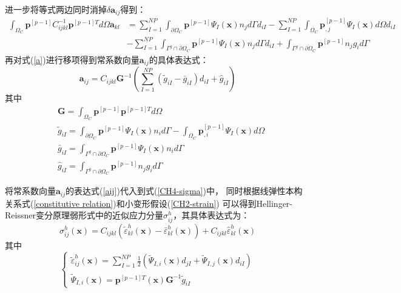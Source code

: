 进一步将等式两边同时消掉$\delta\pmb{a}_{ij}$得到：
\begin{equation}\label{a}
\begin{split}
        \int_{\Omega_C}\pmb{p}^{[p-1]}C^{-1}_{ijkl}\pmb{p}^{[p-1]T}d\Omega\pmb{a}_{kl}&=\sum_{I=1}^{N\!P}\int_{\partial\Omega_C}\pmb{p}^{[p-1]}\Psi_I(\pmb{x})n_jd\Gamma d_{iI}-\sum_{I=1}^{N\!P}\int_{\Omega_C}\pmb{p}_{,j}^{[p-1]}\Psi_{I}(\pmb{x})d\Omega d_{iI}\\
         &-\sum_{I=1}^{N\!P}\int_{\Gamma^g\cap\partial\Omega_C}\pmb{p}^{[p-1]}\Psi_I(\pmb{x})n_jd\Gamma d_{iI}+\int_{\Gamma^g\cap\partial\Omega_C}\pmb{p}^{[p-1]}n_jg_id\Gamma
\end{split}
\end{equation}
再对式(\ref{a})进行移项得到常系数向量$\pmb{a}_{ij}$的具体表达式：
\begin{equation}\label{aij}
 \pmb{a}_{ij}=C_{ijkl}\pmb{G}^{-1}(\sum_{I=1}^{N\!P}(\tilde{g}_{iI}-\bar{g}_{iI})d_{iI}+\hat{g}_{iI})
\end{equation}
其中
\begin{align}
    \label{g1}&\pmb{G}=\int_{\Omega_C}\pmb{p}^{[p-1]}\pmb{p}^{[p-1]T}d\Omega\\
    \label{g2} &\tilde{g}_{iI}=\int_{\partial\Omega_C}\pmb{p}^{[p-1]}\Psi_I(\pmb{x})n_id\Gamma-\int_{\Omega_C}\pmb{p}_{,i}^{[p-1]}\Psi_{I}(\pmb{x})d\Omega\\
    \label{g3} &\bar{g}_{iI}=\int_{\Gamma^g\cap\partial\Omega_C}\pmb{p}^{[p-1]}\Psi_I(\pmb{x})n_id\Gamma\\
   \label{g4} &\hat{g}_{iI}=\int_{\Gamma^g\cap\partial\Omega_C}\pmb{p}^{[p-1]}n_jg_id\Gamma
\end{align}\par
将常系数向量$\pmb{a}_{ij}$的表达式(\ref{aij})代入到式(\ref{CH4-sigma})中，
同时根据线弹性本构关系式(\ref{constitutive relation})和小变形假设(\ref{CH2-strain})
可以得到Hellinger-Reissner变分原理弱形式中的近似应力分量$\sigma^h_{ij}$，其具体表达式为：
\begin{equation}\label{sigmah}
    \sigma^h_{ij}(\pmb{x})=C_{ijkl}(\tilde{\varepsilon}^h_{kl}(\pmb{x})-\bar{\varepsilon}^h_{kl}(\pmb{x}))+C_{ijkl}\hat{\varepsilon}^h_{kl}(\pmb{x})
\end{equation}
其中
\begin{equation}
\begin{cases}\label{case1}
    \tilde{\varepsilon}^h_{ij}(\pmb{x})=\displaystyle\sum_{I=1}^{N\!P}\frac{1}{2}(\tilde{\Psi}_{I,i}(\pmb{x})d_{jI}+\tilde{\Psi}_{I,j}(\pmb{x})d_{iI})\\
    \tilde{\Psi}_{I,i}(\pmb{x})=\pmb{p}^{[p-1]T}(\pmb{x})\pmb{G}^{-1}\tilde{g}_{iI}
\end{cases}
\end{equation}
